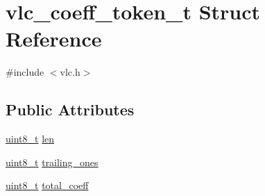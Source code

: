 \hypertarget{structvlc__coeff__token__t}{
\section{vlc\_\-coeff\_\-token\_\-t Struct Reference}
\label{structvlc__coeff__token__t}
}


{\ttfamily \#include $<$vlc.h$>$}

\subsection*{Public Attributes}
\begin{DoxyCompactItemize}
\item 
\hyperlink{_types_8h_a363e4d606232036a6b89060813c45489}{uint8\_\-t} \hyperlink{structvlc__coeff__token__t_a44a0b097012b2c20f2c2da02dfe98e99}{len}
\item 
\hyperlink{_types_8h_a363e4d606232036a6b89060813c45489}{uint8\_\-t} \hyperlink{structvlc__coeff__token__t_aa21454773dd262167cd9b110f1fe6b92}{trailing\_\-ones}
\item 
\hyperlink{_types_8h_a363e4d606232036a6b89060813c45489}{uint8\_\-t} \hyperlink{structvlc__coeff__token__t_a8f1bc5c088694aeb2e4676a3d77abc71}{total\_\-coeff}
\end{DoxyCompactItemize}


